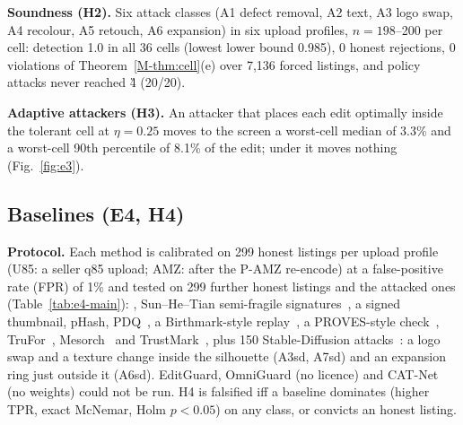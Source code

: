 \documentclass[10pt]{article}
\newcommand{\mainref}[1]{\ref{M-#1}}
\begin{document}
\textbf{Soundness (H2).} Six attack classes (A1 defect removal, A2 text, A3 logo swap, A4 recolour, A5 retouch, A6
expansion) in six upload profiles, $n=198$--200 per cell: detection 1.0 in all 36 cells (lowest lower bound 0.985), 0
honest rejections, 0 violations of Theorem~\mainref{thm:cell}(e) over 7,136 forced listings, and policy attacks never
reached \G{4} (20/20).

\textbf{Adaptive attackers (H3).} An attacker that places each edit optimally inside the tolerant cell at $\eta=0.25$
moves to the screen a worst-cell median of 3.3\% and a worst-cell 90th percentile of 8.1\% of the edit; under \Ezero{} it moves nothing (Fig.~\ref{fig:e3}). 

\subsection{Baselines (E4, H4)}
\textbf{Protocol.} Each method is calibrated on 299 honest listings per upload profile (U85: a seller q85 upload;
AMZ: after the P-AMZ re-encode) at a false-positive rate (FPR) of 1\% and tested on 299 further honest listings and
the attacked ones (Table~\ref{tab:e4-main}): \tierT{}, Sun--He--Tian semi-fragile signatures~\cite{qibinsun2006secure}, a
signed thumbnail, pHash, PDQ~\cite{f2019tmkpdqf}, a Birthmark-style replay~\cite{ryan2026birthmark}, a PROVES-style
check~\cite{xie2022proves}, TruFor~\cite{guillaro2023trufor}, Mesorch~\cite{zhu2025mesoscopic} and
TrustMark~\cite{bui2025trustmark}, plus 150 Stable-Diffusion
attacks~\cite{rombach2022highresolution}: a logo swap and a texture change inside the silhouette (A3sd, A7sd) and an
expansion ring just outside it (A6sd). EditGuard, OmniGuard (no licence) and CAT-Net (no weights) could not be run. H4 is falsified iff a baseline dominates \sys{} (higher TPR, exact McNemar, Holm $p<0.05$) on any
class, or \sys{} convicts an honest listing.
\end{document}
